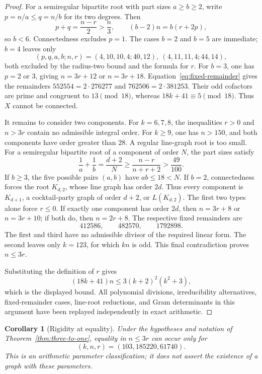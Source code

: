 \documentclass[a4paper,10pt,reqno]{amsart}
\theoremstyle{plain}
\newtheorem{corollary}[theorem]{Corollary}
\theoremstyle{definition}
\theoremstyle{remark}
\newcommand{\resultbox}[1]{\boxed{#1}}
\begin{document}
\begin{proof}
 For a semiregular bipartite root with part sizes \(a\ge b\ge2\),
 write \(p=n/a\le q=n/b\) for its two degrees.  Then
 \[
  p+q=\frac{n-r}{2}>\frac n3,
  \qquad (b-2)n=b(r+2p),
 \]
 so \(b<6\).  Connectedness excludes \(p=1\).  The cases \(b=2\) and
 \(b=5\) are immediate; \(b=4\) leaves only
 \[
  (p,q,a,b;n,r)=(4,10,10,4;40,12),\ (4,11,11,4;44,14),
 \]
 both excluded by the radius-two bound and the formula for \(r\).
 For \(b=3\), one has \(p=2\) or \(3\), giving \(n=3r+12\) or
 \(n=3r+18\).  Equation~\eqref{eq:fixed-remainder} gives the remainders
 \(552554=2\cdot276277\) and \(762506=2\cdot381253\).  Their odd cofactors
 are prime and congruent to \(13\pmod {18}\), whereas \(18k+41\equiv5
 \pmod {18}\).  Thus \(X\) cannot be connected.

 It remains to consider two components.  For \(k=6,7,8\), the inequalities
 \(r>0\) and \(n>3r\) contain no admissible integral order.  For \(k\ge9\),
 one has \(n>150\), and both components have order greater than \(28\).
 A regular line-graph root is too small.  For a semiregular bipartite root
 of a component of order \(N\), the part sizes satisfy
 \[
  \frac1a+\frac1b=\frac{d+2}{N}
  \ge\frac{n-r}{n+r+2}>\frac{49}{100}.
 \]
 If \(b\ge3\), the five possible pairs \((a,b)\) have \(ab\le18<N\).
 If \(b=2\), connectedness forces the root \(K_{d,2}\), whose line graph has
 order \(2d\).  Thus every component is \(K_{d+1}\), a cocktail-party graph
 of order \(d+2\), or \(L(K_{d,2})\).  The first two types alone force
 \(r\le0\).  If exactly one component has order \(2d\), then
 \(n=3r+8\) or \(n=3r+10\); if both do, then \(n=2r+8\).
 The respective fixed remainders are
 \[
  412586,\qquad482570,\qquad1792898.
 \]
 The first and third have no admissible divisor of the required linear form.
 The second leaves only \(k=123\), for which \(kn\) is odd.  This final
 contradiction proves \(n\le3r\).

 Substituting the definition of \(r\) gives
 \[
  (18k+41)n\le3(k+2)^2(k^2+3),
 \]
 which is the displayed bound.  All polynomial divisions, irreducibility
 alternatives, fixed-remainder cases, line-root reductions, and Gram
 determinants in this argument have been replayed independently in exact
 arithmetic.
\end{proof}

\begin{corollary}[Rigidity at equality]\label{cor:three-to-one-equality}
Under the hypotheses and notation of Theorem~\ref{thm:three-to-one}, equality
in \(n\le3r\) can occur only for
\[
 \resultbox{(k,n,r)=(103,185220,61740).}
\]
This is an arithmetic parameter classification; it does not assert the
existence of a graph with these parameters.
\end{corollary}
\end{document}
